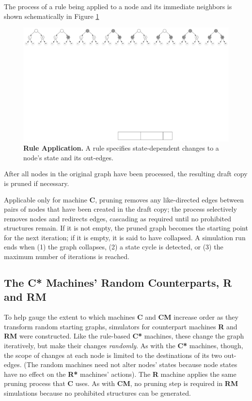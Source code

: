 \documentclass{tufte-handout}
\begin{document}
The process of a rule being applied to a node and its immediate neighbors is shown
schematically in Figure \ref{fig:Ruleapplication}

\begin{figure}
\includegraphics{placeholder.png}
\caption{\textbf{Rule Application.} A rule specifies state-dependent changes to a node's state and its out-edges.}
\label{fig:Ruleapplication}
\end{figure}

After all nodes in the original graph have been processed,
the resulting draft copy is pruned if necessary.

Applicable only for machine \textbf{C}, pruning removes
any like-directed edges between pairs of nodes that have been created in the
draft copy; the process selectively removes nodes
and redirects edges, cascading as required until no prohibited structures remain.
If it is not empty, the pruned graph becomes the starting point for the next iteration;
if it is empty, it is said to have collapsed.
A simulation run ends when (1) the graph collapses, (2) a state cycle is detected,
or (3) the maximum number of iterations is reached.

\subsection{The \textbf{C*} Machines' Random Counterparts, \textbf{R} and \textbf{RM}}

To help gauge the extent to which machines \textbf{C} and \textbf{CM}
increase order as they transform random starting graphs, simulators for counterpart
machines \textbf{R} and \textbf{RM} were constructed. Like the rule-based \textbf{C*} machines,
these change the graph iteratively, but make their changes \textit{randomly}.
As with the \textbf{C*} machines, though, the scope of changes at each node is
limited to the destinations of its two out-edges. (The random machines need not alter nodes' states
because node states have no effect on the \textbf{R*} machines' actions).
The \textbf{R} machine applies the same pruning process that \textbf{C} uses. As
with \textbf{CM}, no pruning step is required in \textbf{RM} simulations because
no prohibited structures can be generated.
\end{document}
